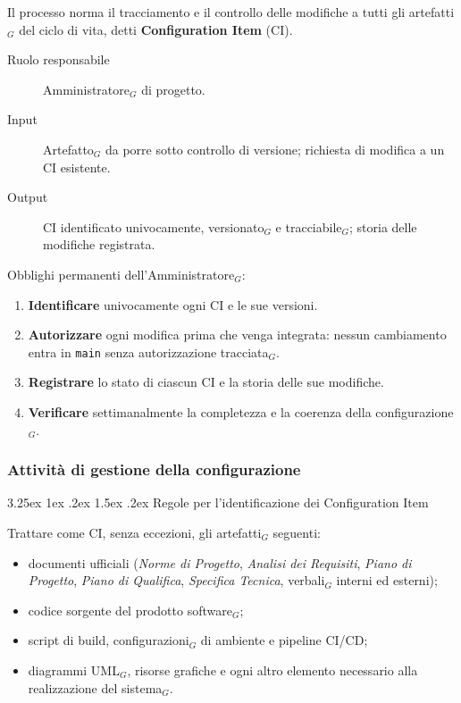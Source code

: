 \documentclass[a4paper, 10pt]{article}
\makeatletter
\renewcommand\paragraph{\@startsection{paragraph}{4}{\z@}%
  {3.25ex \@plus1ex \@minus .2ex}%
  {1.5ex \@plus .2ex}%
  {\normalfont\normalsize\bfseries}}
\makeatother
\begin{document}
Il processo norma il tracciamento e il controllo delle modifiche a tutti gli artefatti$_G$ del ciclo di vita, detti \textbf{Configuration Item} (CI).

\begin{description}
    \item[Ruolo responsabile] Amministratore$_G$ di progetto.
    \item[Input] Artefatto$_G$ da porre sotto controllo di versione; richiesta di modifica a un CI esistente.
    \item[Output] CI identificato univocamente, versionato$_G$ e tracciabile$_G$; storia delle modifiche registrata.
\end{description}

\noindent Obblighi permanenti dell'Amministratore$_G$:
\begin{enumerate}
    \item \textbf{Identificare} univocamente ogni CI e le sue versioni.
    \item \textbf{Autorizzare} ogni modifica prima che venga integrata: nessun cambiamento entra in \texttt{main} senza autorizzazione tracciata$_G$.
    \item \textbf{Registrare} lo stato di ciascun CI e la storia delle sue modifiche.
    \item \textbf{Verificare} settimanalmente la completezza e la coerenza della configurazione$_G$.
\end{enumerate}

\subsubsection{Attività di gestione della configurazione}
\label{subsubsec:attivita_configurazione}

\paragraph{Regole per l'identificazione dei Configuration Item}

Trattare come CI, senza eccezioni, gli artefatti$_G$ seguenti:
\begin{itemize}
    \item documenti ufficiali (\emph{Norme di Progetto}, \emph{Analisi dei Requisiti}, \emph{Piano di Progetto}, \emph{Piano di Qualifica}, \emph{Specifica Tecnica}, verbali$_G$ interni ed esterni);
    \item codice sorgente del prodotto software$_G$;
    \item script di build, configurazioni$_G$ di ambiente e pipeline CI/CD;
    \item diagrammi UML$_G$, risorse grafiche e ogni altro elemento necessario alla realizzazione del sistema$_G$.
\end{itemize}
\end{document}
